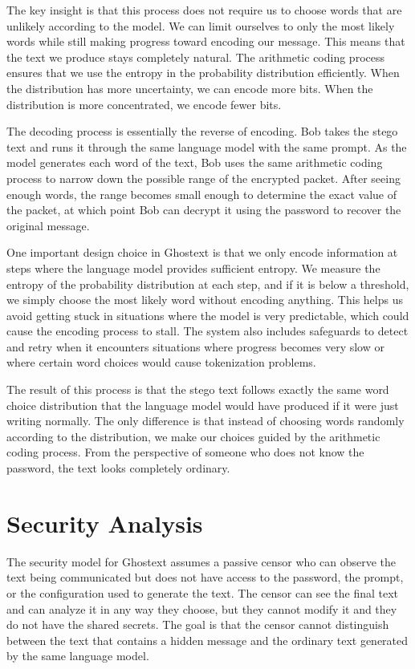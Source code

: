 \documentclass[sigconf,review,anonymous]{acmart}
\begin{document}
The key insight is that this process does not require us to choose words that are unlikely according to the model. We can limit ourselves to only the most likely words while still making progress toward encoding our message. This means that the text we produce stays completely natural. The arithmetic coding process ensures that we use the entropy in the probability distribution efficiently. When the distribution has more uncertainty, we can encode more bits. When the distribution is more concentrated, we encode fewer bits.

The decoding process is essentially the reverse of encoding. Bob takes the stego text and runs it through the same language model with the same prompt. As the model generates each word of the text, Bob uses the same arithmetic coding process to narrow down the possible range of the encrypted packet. After seeing enough words, the range becomes small enough to determine the exact value of the packet, at which point Bob can decrypt it using the password to recover the original message.

One important design choice in Ghostext is that we only encode information at steps where the language model provides sufficient entropy. We measure the entropy of the probability distribution at each step, and if it is below a threshold, we simply choose the most likely word without encoding anything. This helps us avoid getting stuck in situations where the model is very predictable, which could cause the encoding process to stall. The system also includes safeguards to detect and retry when it encounters situations where progress becomes very slow or where certain word choices would cause tokenization problems.

The result of this process is that the stego text follows exactly the same word choice distribution that the language model would have produced if it were just writing normally. The only difference is that instead of choosing words randomly according to the distribution, we make our choices guided by the arithmetic coding process. From the perspective of someone who does not know the password, the text looks completely ordinary.

\section{Security Analysis}

The security model for Ghostext assumes a passive censor who can observe the text being communicated but does not have access to the password, the prompt, or the configuration used to generate the text. The censor can see the final text and can analyze it in any way they choose, but they cannot modify it and they do not have the shared secrets. The goal is that the censor cannot distinguish between the text that contains a hidden message and the ordinary text generated by the same language model.
\end{document}
